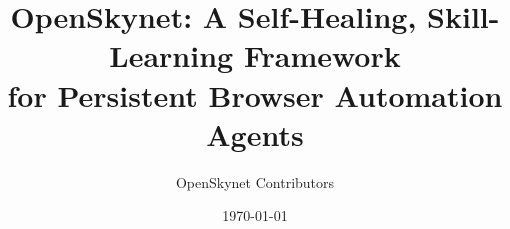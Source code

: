 \documentclass[11pt,a4paper]{article}
\title{\textbf{\sffamily OpenSkynet: A Self-Healing, Skill-Learning Framework\\for Persistent Browser Automation Agents}}
\author{\sffamily OpenSkynet Contributors}
\date{\today}
\begin{document}
\maketitle

\begin{abstract}

\end{abstract}












\end{document}
